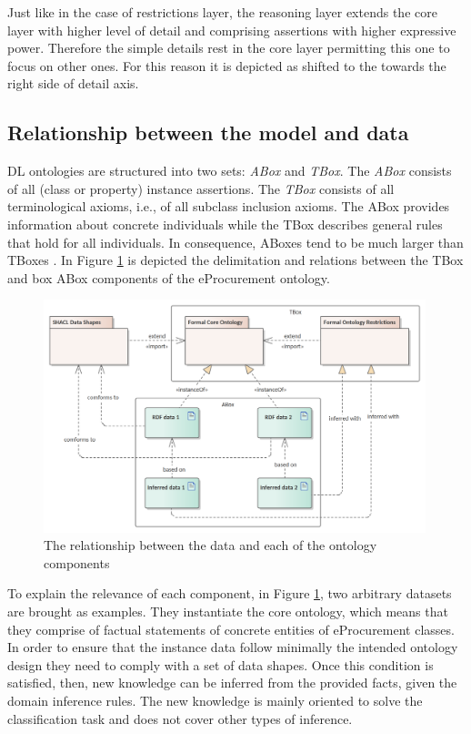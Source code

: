 	Just like in the case of restrictions layer, the reasoning layer extends the core layer with higher level of detail and comprising assertions with higher expressive power. Therefore the simple details rest in the core layer permitting this one to focus on other ones. For this reason it is depicted as shifted to the towards the right side of detail axis.
	

	\subsection{Relationship between the model and data}
	\label{sec:model-data}
	
	DL ontologies are structured into two sets: \textit{ABox} and \textit{TBox}. The \textit{ABox} consists of all (class or property) instance assertions. The \textit{TBox }consists of all terminological axioms, i.e., of all subclass inclusion axioms. The ABox provides information about concrete individuals while the TBox describes general rules that hold for all individuals. In consequence, ABoxes tend to be much larger than TBoxes \citep{krotzsch2012owl}. In Figure \ref{fig:abox-tbox} is depicted the delimitation and relations between the TBox and box ABox components of the eProcurement ontology.
	
	\begin{figure}[!ht]
		\centering
		\includegraphics[width=0.99\textwidth]{../img/ontology.png}
		\caption{The relationship between the data and each of the ontology components}
		\label{fig:abox-tbox}
	\end{figure}
	
	To explain the relevance of each component, in Figure \ref{fig:abox-tbox}, two arbitrary datasets are brought as examples. They instantiate the core ontology, which means that they comprise of factual statements of concrete entities of eProcurement classes. In order to ensure that the instance data follow minimally the intended ontology design they need to comply with a set of data shapes. Once this condition is satisfied, then, new knowledge can be inferred from the provided facts, given the domain inference rules. The new knowledge is mainly oriented to solve the classification task and does not cover other types of inference. 	
	
